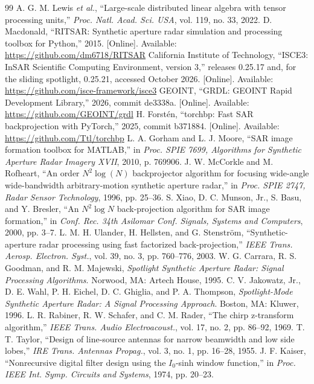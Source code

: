 \documentclass[11pt]{article}
\begin{document}
\begin{thebibliography}{99}
 A. G. M. Lewis \emph{et al.}, ``Large-scale distributed linear algebra with tensor processing units,'' \emph{Proc. Natl. Acad. Sci. USA}, vol. 119, no. 33, 2022.
 D. Macdonald, ``RITSAR: Synthetic aperture radar simulation and processing toolbox for Python,'' 2015. [Online]. Available: \url{https://github.com/dm6718/RITSAR}
 California Institute of Technology, ``ISCE3: InSAR Scientific Computing Environment, version 3,'' releases 0.25.17 and, for the sliding spotlight, 0.25.21, accessed October 2026. [Online]. Available: \url{https://github.com/isce-framework/isce3}
 GEOINT, ``GRDL: GEOINT Rapid Development Library,'' 2026, commit de3338a. [Online]. Available: \url{https://github.com/GEOINT/grdl}
 H. Forst\'en, ``torchbp: Fast SAR backprojection with PyTorch,'' 2025, commit b371884. [Online]. Available: \url{https://github.com/Ttl/torchbp}
 L. A. Gorham and L. J. Moore, ``SAR image formation toolbox for MATLAB,'' in \emph{Proc. SPIE 7699, Algorithms for Synthetic Aperture Radar Imagery XVII}, 2010, p. 769906.
 J. W. McCorkle and M. Rofheart, ``An order $N^2 \log(N)$ backprojector algorithm for focusing wide-angle wide-bandwidth arbitrary-motion synthetic aperture radar,'' in \emph{Proc. SPIE 2747, Radar Sensor Technology}, 1996, pp. 25--36.
 S. Xiao, D. C. Munson, Jr., S. Basu, and Y. Bresler, ``An $N^2 \log N$ back-projection algorithm for SAR image formation,'' in \emph{Conf. Rec. 34th Asilomar Conf. Signals, Systems and Computers}, 2000, pp. 3--7.
 L. M. H. Ulander, H. Hellsten, and G. Stenstr\"om, ``Synthetic-aperture radar processing using fast factorized back-projection,'' \emph{IEEE Trans. Aerosp. Electron. Syst.}, vol. 39, no. 3, pp. 760--776, 2003.
 W. G. Carrara, R. S. Goodman, and R. M. Majewski, \emph{Spotlight Synthetic Aperture Radar: Signal Processing Algorithms}. Norwood, MA: Artech House, 1995.
 C. V. Jakowatz, Jr., D. E. Wahl, P. H. Eichel, D. C. Ghiglia, and P. A. Thompson, \emph{Spotlight-Mode Synthetic Aperture Radar: A Signal Processing Approach}. Boston, MA: Kluwer, 1996.
 L. R. Rabiner, R. W. Schafer, and C. M. Rader, ``The chirp z-transform algorithm,'' \emph{IEEE Trans. Audio Electroacoust.}, vol. 17, no. 2, pp. 86--92, 1969.
 T. T. Taylor, ``Design of line-source antennas for narrow beamwidth and low side lobes,'' \emph{IRE Trans. Antennas Propag.}, vol. 3, no. 1, pp. 16--28, 1955.
 J. F. Kaiser, ``Nonrecursive digital filter design using the $I_0$-sinh window function,'' in \emph{Proc. IEEE Int. Symp. Circuits and Systems}, 1974, pp. 20--23.

\end{thebibliography}
\end{document}
